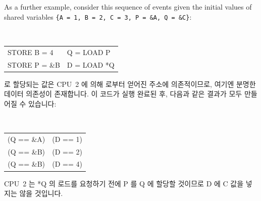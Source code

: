 As a further example, consider this sequence of events given the
initial values of shared variables
{\tt \{A~=~1, B~=~2, C~=~3, P~=~\&A, Q~=~\&C\}}:
\fi

\vspace{5pt}
\begin{minipage}[t]{\columnwidth}
\tt
\scriptsize
\begin{tabular}{l|l}
	\nf{CPU 1}	& \nf{CPU 2} \\
	\hline
	STORE B = 4	& Q = LOAD P \\
	STORE P = \&B	& D = LOAD *Q \\
\end{tabular}
\end{minipage}
\vspace{5pt}

 로 할당되는 값은 CPU~2 에 의해  로부터 얻어진 주소에 의존적이므로,
여기엔 분명한 데이터 의존성이 존재합니다.
이 코드가 실행 완료된 후, 다음과 같은 결과가 모두 만들어질 수 있습니다:

\vspace{5pt}
\begin{minipage}[t]{\columnwidth}
\tt
\scriptsize
\begin{tabular}{c@{ and }c}
	(Q == \&A) & (D == 1) \\
	(Q == \&B) & (D == 2) \\
	(Q == \&B) & (D == 4) \\
\end{tabular}
\end{minipage}
\vspace{5pt}

CPU~2 는 *Q 의 로드를 요청하기 전에 P 를 Q 에 할당할 것이므로 D 에 C 값을
넣지는 않을 것입니다.

